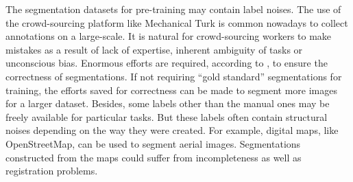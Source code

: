 The segmentation datasets for pre-training may contain label noises.
The use of the crowd-sourcing platform like Mechanical Turk is common nowadays to collect annotations on a large-scale.
It is natural for crowd-sourcing workers to make mistakes as a result of lack of expertise, inherent ambiguity of tasks or unconscious bias.
Enormous efforts are required, according to  \cite{lin2014microsoft,everingham2015pascal}, to ensure the correctness of segmentations.
If not requiring ``gold standard'' segmentations for training, the efforts saved for correctness can be made to segment more images for a larger dataset.
Besides,  some labels other than the manual ones may be freely available for particular tasks.
But these labels often contain structural noises depending on the way they were created.
For example, digital maps, like OpenStreetMap, can be used to segment aerial images.
Segmentations constructed from the maps could suffer from incompleteness as well as registration problems. \cite{mnih2012learning}




